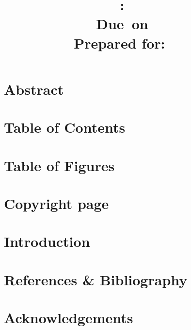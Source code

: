 \documentclass{article}
\title{
\vspace{2in}
\textmd{\textbf{\TeamName:\ \DocTitle}}\\
\normalsize\vspace{0.1in}\small{Due\ on\ \DocDueDate}\\
\vspace{0.1in}\large{Prepared for: \textit{\Instructor\ }}
\vspace{3in}
}
\author{\textbf{\DocAuthorName}}
\date{} %
\begin{document}
\maketitle


\section{Abstract}


\section{Table of Contents}

\newpage
\tableofcontents
\newpage

\section{Table of Figures}


\section{Copyright page}


\section{Introduction}

\section{References \& Bibliography}

\section{Acknowledgements}
\end{document}
